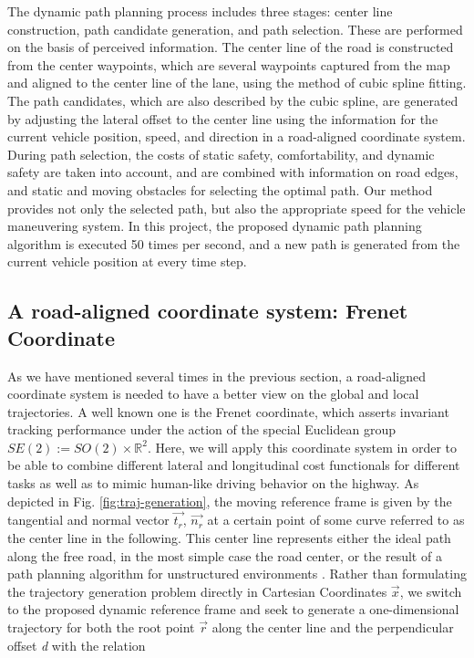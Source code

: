 The dynamic path planning process includes three stages: center line construction, path candidate generation, and path selection. These are performed on the basis of perceived information. The center line of the road is constructed from the center waypoints, which are several waypoints captured from the map and aligned to the center line of the lane, using the method of cubic spline fitting. The path candidates, which are also described by the cubic spline, are generated by adjusting the lateral offset to the center line using the information for the current vehicle position, speed, and direction in a road-aligned coordinate system. During path selection, the costs of static safety, comfortability, and dynamic safety are taken into account, and are combined with information on road edges, and static and moving obstacles for selecting the optimal path. Our method provides not only the selected path, but also the appropriate speed for the vehicle maneuvering system. In this project, the proposed dynamic path planning algorithm is executed 50 times per second, and a new path is generated from the current vehicle position at every time step. 

\subsection{A road-aligned coordinate system: Frenet Coordinate}

As we have mentioned several times in the previous section, a road-aligned coordinate system is needed to have a better view on the global and local trajectories. A well known one is the Frenet coordinate, which asserts invariant tracking performance under the action of the special Euclidean group $SE(2) := SO(2) \times \mathbb{R}^2$. Here, we will apply this coordinate system in order to be able to combine different lateral and longitudinal cost functionals for different tasks as well as to mimic human-like driving behavior on the highway. As depicted in Fig. \ref{fig:traj-generation}, the moving reference frame is given by the tangential and normal vector $\overrightarrow{t_r}$, $\overrightarrow{n_r}$ at a certain point of some curve referred to as the center line in the following. This center line represents either the ideal path along the free road, in the most simple case the road center, or the result of a path planning algorithm for unstructured environments \cite{Frenet2008}. Rather than formulating the trajectory generation problem directly in Cartesian Coordinates $\overrightarrow{x}$, we switch to the proposed dynamic reference frame and seek to generate a one-dimensional trajectory for both the root point $\overrightarrow{r}$ along the center line and the perpendicular offset \textit{d} with the relation

